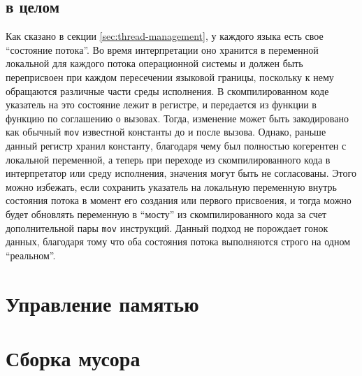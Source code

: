 \documentclass[times,specification,annotation]{itmo-student-thesis}
\begin{document}
\subsection{в целом}
Как сказано в секции \ref{sec:thread-management}, у каждого языка есть свое ``состояние потока''. Во время интерпретации оно хранится в переменной локальной для каждого потока операционной системы и должен быть переприсвоен при каждом пересечении языковой границы, поскольку к нему обращаются различные части среды исполнения. В скомпилированном коде указатель на это состояние лежит в регистре, и передается из функции в функцию по соглашению о вызовах. Тогда, изменение может быть закодировано как обычный \texttt{mov} известной константы до и после вызова. Однако, раньше данный регистр хранил константу, благодаря чему был полностью когерентен с локальной переменной, а теперь при переходе из скомпилированного кода в интерпретатор или среду исполнения, значения могут быть не согласованы. Этого можно избежать, если сохранить указатель на локальную переменную внутрь состояния потока в момент его создания или первого присвоения, и тогда можно будет обновлять переменную в ``мосту'' из скомпилированного кода за счет дополнительной пары \texttt{mov} инструкций. Данный подход не порождает гонок данных, благодаря тому что оба состояния потока выполняются строго на одном ``реальном''.

\section{Управление памятью}

\section{Сборка мусора}
\end{document}
